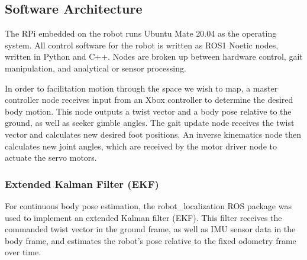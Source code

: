 \subsection{ Software Architecture }

The RPi embedded on the robot runs Ubuntu Mate 20.04 as the operating system. All control software for the robot is written as ROS1 Noetic nodes, written in Python and C++. Nodes are broken up between hardware control, gait manipulation, and analytical or sensor processing.

In order to facilitation motion through the space we wish to map, a master controller node receives input from an Xbox controller to determine the desired body motion. This node outputs a twist vector and a body pose relative to the ground, as well as seeker gimble angles. The gait update node receives the twist vector and calculates new desired foot positions. An inverse kinematics node then calculates new joint angles, which are received by the motor driver node to actuate the servo motors.

\subsubsection{ Extended Kalman Filter (EKF)}

For continuous body pose estimation, the robot\_localization ROS package \cite{robotlocalization} was used to implement an extended Kalman filter (EKF). This filter receives the commanded twist vector in the ground frame, as well as IMU sensor data in the body frame, and estimates the robot's pose relative to the fixed odometry frame over time.
